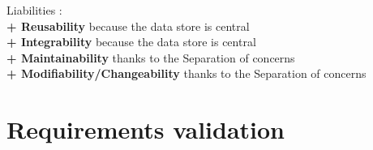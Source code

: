 \textit{} Liabilities : \\
\textbf{+ Reusability} because the data store is central \\
\textbf{+ Integrability} because the data store is central \\
\textbf{+ Maintainability} thanks to the Separation of concerns \\
\textbf{+ Modifiability/Changeability} thanks to the Separation of concerns\\

\section{Requirements validation}
\label{sec:req-validation}




